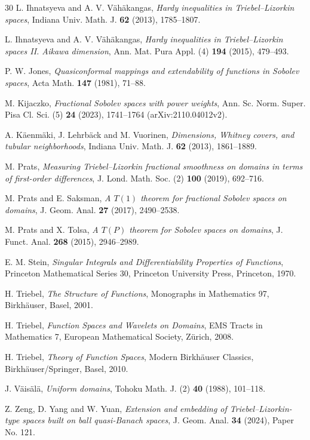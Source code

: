 \begin{thebibliography}{30}
 L. Ihnatsyeva and A. V. V\"ah\"akangas, \emph{Hardy inequalities in Triebel--Lizorkin spaces}, Indiana Univ. Math. J. \textbf{62} (2013), 1785--1807.

 L. Ihnatsyeva and A. V. V\"ah\"akangas, \emph{Hardy inequalities in Triebel--Lizorkin spaces II. Aikawa dimension}, Ann. Mat. Pura Appl. (4) \textbf{194} (2015), 479--493.

 P. W. Jones, \emph{Quasiconformal mappings and extendability of functions in Sobolev spaces}, Acta Math. \textbf{147} (1981), 71--88.

 M. Kijaczko, \emph{Fractional Sobolev spaces with power weights}, Ann. Sc. Norm. Super. Pisa Cl. Sci. (5) \textbf{24} (2023), 1741--1764 (arXiv:2110.04012v2).

 A. K\"aenm\"aki, J. Lehrb\"ack and M. Vuorinen, \emph{Dimensions, Whitney covers, and tubular neighborhoods}, Indiana Univ. Math. J. \textbf{62} (2013), 1861--1889.

 M. Prats, \emph{Measuring Triebel--Lizorkin fractional smoothness on domains in terms of first-order differences}, J. Lond. Math. Soc. (2) \textbf{100} (2019), 692--716.

 M. Prats and E. Saksman, \emph{A $T(1)$ theorem for fractional Sobolev spaces on domains}, J. Geom. Anal. \textbf{27} (2017), 2490--2538.

 M. Prats and X. Tolsa, \emph{A $T(P)$ theorem for Sobolev spaces on domains}, J. Funct. Anal. \textbf{268} (2015), 2946--2989.

 E. M. Stein, \emph{Singular Integrals and Differentiability Properties of Functions}, Princeton Mathematical Series 30, Princeton University Press, Princeton, 1970.

 H. Triebel, \emph{The Structure of Functions}, Monographs in Mathematics 97, Birkh\"auser, Basel, 2001.

 H. Triebel, \emph{Function Spaces and Wavelets on Domains}, EMS Tracts in Mathematics 7, European Mathematical Society, Z\"urich, 2008.

 H. Triebel, \emph{Theory of Function Spaces}, Modern Birkh\"auser Classics, Birkh\"auser/Springer, Basel, 2010.

 J. V\"ais\"al\"a, \emph{Uniform domains}, Tohoku Math. J. (2) \textbf{40} (1988), 101--118.

 Z. Zeng, D. Yang and W. Yuan, \emph{Extension and embedding of Triebel--Lizorkin-type spaces built on ball quasi-Banach spaces}, J. Geom. Anal. \textbf{34} (2024), Paper No. 121.

\end{thebibliography}


